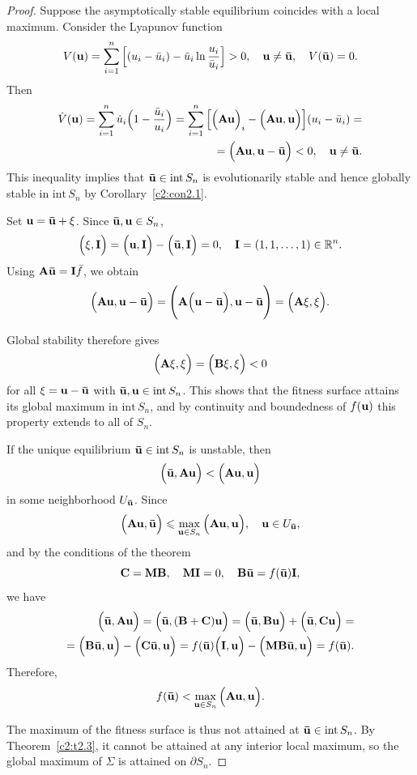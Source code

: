\documentclass[12pt]{report}
\newcommand{\R}{\mathbb{R}}
\newcommand{\inside}{\mathrm{int}\,}
\newcommand{\bound}{\partial}
\theoremstyle{definition}
\theoremstyle{remark}
\begin{document}
\begin{proof}
	Suppose the asymptotically stable equilibrium coincides with a local maximum. Consider the Lyapunov function
	$$
	V({\bf u}) = \sum\limits_{i = 1}^{n}\Big[(u_{i} - \bar{u}_{i}) - \bar{u}_{i}\ln{\frac{u_{i}}{\bar{u}_{i}}}\Big] > 0, \quad {\bf u} \neq {\bf \bar{u}}, \quad V({\bf \bar{u}}) = 0.
	$$
	Then
	\begin{align*}
		\dot{V}({\bf u}) = \sum\limits_{i = 1}^{n}\dot{u}_{i}\Big(1 - \frac{\bar{u}_{i}}{u_{i}}\Big) = \sum\limits_{i = 1}^{n}\Big[\Big({\bf Au}\Big)_{i} - \Big({\bf Au, u}\Big)\Big](u_{i} - \bar{u}_{i}) = \\ = \Big({\bf Au, u - \bar{u}}\Big) < 0, \quad {\bf u} \neq {\bf \bar{u}}.
	\end{align*}
	This inequality implies that ${\bf \bar{u}} \in \inside S_{n}$ is evolutionarily stable and hence globally stable in $\inside S_{n}$ by Corollary~\ref{c2:con2.1}.
	
	Set ${\bf u} = {\bf \bar{u} + \xi}$. Since ${\bf \bar{u}, u} \in S_{n}$,
	$$
	\Big({\bf \xi, I}\Big) = \Big({\bf u, I}\Big) - \Big({\bf \bar{u}, I}\Big) = 0, \quad {\bf I} = (1, 1, \ldots, 1) \in \R^{n}.
	$$
    Using ${\bf A\bar{u}} = {\bf I}\bar{f}$, we obtain
	$$
	\Big({\bf Au, u - \bar{u}}\Big) = \Bigg({\bf A}\Big({\bf u - \bar{u}}\Big), {\bf u - \bar{u}}\Bigg) = \Big({\bf A\xi, \xi}\Big).
	$$
	
	Global stability therefore gives
	$$
	\Big({\bf A\xi, \xi}\Big) = \Big({\bf B\xi, \xi}\Big) < 0
	$$ for all ${\bf \xi} = {\bf u - \bar{u}}$ with ${\bf \bar{u}, u} \in \inside S_{n}$. This shows that the fitness surface attains its global maximum in $\inside S_{n}$, and by continuity and boundedness of $f({\bf u})$ this property extends to all of $S_{n}$.
	
	If the unique equilibrium ${\bf \bar{u}} \in \inside S_{n}$ is unstable, then
	$$
	\Big({\bf \bar{u}, Au}\Big) < \Big({\bf Au, u}\Big)
	$$
	in some neighborhood $U_{{\bf \bar{u}}}$. Since
	$$
	\Big({\bf Au, \bar{u}}\Big) \leqslant \max\limits_{{\bf u} \in S_{n}}\Big({\bf Au, u}\Big), \quad {\bf u} \in U_{{\bf \bar{u}}},
	$$
	and by the conditions of the theorem 
    $${\bf C} = {\bf MB},\quad {\bf MI} = 0, \quad{\bf B\bar{u}} = f({\bf \bar{u}}){\bf I},$$ we have
	\begin{align*}
		\Big({\bf \bar{u}, Au}\Big) = \Big({\bf \bar{u}, (B + C)u}\Big) = \Big({\bf \bar{u}, Bu}\Big) + \Big({\bf \bar{u}, Cu}\Big) = \\ = \Big({\bf B\bar{u}, u}\Big) - \Big({\bf C\bar{u}, u}\Big) = f({\bf \bar{u}})\Big({\bf I, u}\Big) - \Big({\bf MB\bar{u}, u}\Big) = f({\bf \bar{u}}).
	\end{align*}
	Therefore,
	$$
	f({\bf \bar{u}}) < \max\limits_{{\bf u} \in S_{n}}\Big({\bf Au, u}\Big).
	$$
	
	The maximum of the fitness surface is thus not attained at ${\bf \bar{u}} \in \inside S_{n}$. By Theorem~\ref{c2:t2.3}, it cannot be attained at any interior local maximum, so the global maximum of $\Sigma$ is attained on $\bound S_{n}$. 
\end{proof}
\end{document}
